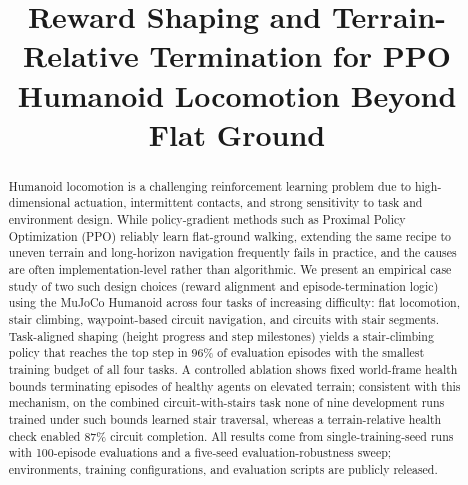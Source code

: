 \documentclass[conference,a4paper]{IEEEtran}
\begin{document}
\title{Reward Shaping and Terrain-Relative Termination for PPO Humanoid Locomotion Beyond Flat Ground}

\author{
\and
{}
\and
{}
\and
{}
}

\maketitle
{}

\begin{abstract}
Humanoid locomotion is a challenging reinforcement learning problem due to high-dimensional actuation, intermittent contacts, and strong sensitivity to task and environment design. While policy-gradient methods such as Proximal Policy Optimization (PPO) reliably learn flat-ground walking, extending the same recipe to uneven terrain and long-horizon navigation frequently fails in practice, and the causes are often implementation-level rather than algorithmic. We present an empirical case study of two such design choices (reward alignment and episode-termination logic) using the MuJoCo Humanoid across four tasks of increasing difficulty: flat locomotion, stair climbing, waypoint-based circuit navigation, and circuits with stair segments. Task-aligned shaping (height progress and step milestones) yields a stair-climbing policy that reaches the top step in 96\% of evaluation episodes with the smallest training budget of all four tasks. A controlled ablation shows fixed world-frame health bounds terminating episodes of healthy agents on elevated terrain; consistent with this mechanism, on the combined circuit-with-stairs task none of nine development runs trained under such bounds learned stair traversal, whereas a terrain-relative health check enabled 87\% circuit completion. All results come from single-training-seed runs with 100-episode evaluations and a five-seed evaluation-robustness sweep; environments, training configurations, and evaluation scripts are publicly released.
\end{abstract}
\end{document}
